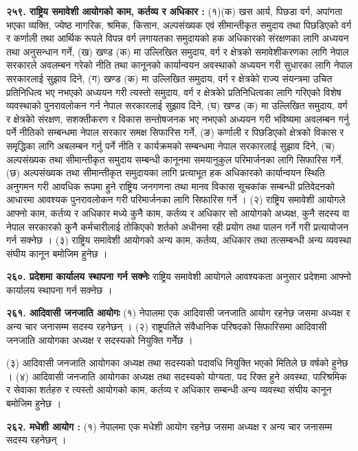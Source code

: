 \textbf{२५९. राष्ट्रिय समावेशी आयोगको काम, कर्तव्य र अधिकार :} (१)(क) खस आर्य, पिछडा वर्ग, अपांगता भएका व्यक्ति, ज्येष्ठ नागरिक, श्रमिक, किसान, अल्पसंख्यक एवं सीमान्तीकृत समुदाय तथा पिछडिएको वर्ग र कर्णाली तथा आर्थिक रूपले विपन्न वर्ग लगायतका समुदायको हक अधिकारको संरक्षणका लागि अध्ययन तथा अनुसन्धान गर्ने,
(ख) खण्ड (क) मा उल्लिखित समुदाय, वर्ग र क्षेत्रको समावेशीकरणका लागि नेपाल सरकारले अवलम्बन गरेको
नीति तथा कानूनको कार्यान्वयन अवस्थाको अध्ययन गरी सुधारका लागि नेपाल सरकारलाई सुझाव दिने,
(ग) खण्ड (क) मा उल्लिखित समुदाय, वर्ग र क्षेत्रकोे राज्य संयन्त्रमा उचित प्रतिनिधित्व भए नभएको अध्ययन गरी त्यस्तो समुदाय, वर्ग र क्षेत्रकोे प्रतिनिधित्वका लागि गरिएको विशेष व्यवस्थाको पुनरावलोकन गर्न नेपाल सरकारलाई सुझाव दिने,
(घ) खण्ड (क) मा उल्लिखित समुदाय, वर्ग र क्षेत्रकोे संरक्षण, सशक्तीकरण र विकास सन्तोषजनक भए नभएको अध्ययन गरी भविष्यमा अवलम्बन गर्नु पर्ने नीतिको सम्बन्धमा नेपाल सरकार समक्ष सिफारिस गर्ने,
(ङ) कर्णाली र पिछडिएको क्षेत्रको विकास र समृृद्धिका लागि अबलम्बन गर्नु पर्ने नीति र कार्यक्रमको सम्बन्धमा नेपाल सरकारलाई सुझाव दिने,
(च) अल्पसंख्यक तथा सीमान्तीकृत समुदाय सम्बन्धी कानूनमा समयानुकुल परिमार्जनका लागि सिफारिस गर्ने,
(छ) अल्पसंख्यक तथा सीमान्तीकृत समुदायका लागि प्रत्याभूत हक अधिकारको कार्यान्वयन स्थिति अनुगमन गरी आवधिक रूपमा हुने राष्ट्रिय जनगणना तथा मानव विकास सूचकांक सम्बन्धी प्रतिवेदनको आधारमा आवश्यक पुनरावलोकन गरी परिमार्जनका लागि सिफारिस गर्ने ।
(२) राष्ट्रिय समावेशी आयोगले आफ्नो काम, कर्तव्य र अधिकार मध्ये कुनै काम, कर्तव्य र अधिकार सो आयोगको अध्यक्ष, कुनै सदस्य वा नेपाल सरकारको कुनै कर्मचारीलाई तोकिएको शर्तको अधीनमा रही प्रयोग तथा पालन गर्ने गरी प्रत्यायोजन गर्न सक्नेछ ।
(३) राष्ट्रिय समावेशी आयोगको अन्य काम, कर्तव्य, अधिकार तथा तत्सम्बन्धी अन्य व्यवस्था संघीय कानून बमोजिम हुनेछ ।

\textbf{२६०. प्रदेशमा कार्यालय स्थापना गर्न सक्नेः} राष्ट्रिय समावेशी आयोगले आवश्यकता अनुसार प्रदेशमा आफ्नो कार्यालय स्थापना गर्न सक्नेछ ।

\textbf{२६१. आदिवासी जनजाति आयोगः} (१) नेपालमा एक आदिवासी जनजाति आयोग रहनेछ जसमा अध्यक्ष र अन्य चार जनासम्म सदस्य रहनेछन् ।
(२) राष्ट्रपतिले संवैधानिक परिषदको सिफारिसमा आदिवासी जनजाति आयोगका अध्यक्ष र सदस्यको नियुक्ति गर्नेेछ ।

(३) आदिवासी जनजाति आयोगका अध्यक्ष तथा सदस्यको पदावधि नियुक्ति भएको मितिले छ वर्षको हुनेछ ।
(४) आदिवासी जनजाति आयोगका अध्यक्ष तथा सदस्यको योग्यता, पद रिक्त हुने अवस्था, पारिश्रमिक र सेवाका शर्तहरु र त्यस्तो आयोगको काम, कर्तव्य र अधिकार सम्बन्धी अन्य व्यवस्था संघीय कानून बमोजिम हुनेछ ।

\textbf{२६२. मधेशी आयोग :} (१) नेपालमा एक मधेशी आयोग रहनेछ जसमा अध्यक्ष र अन्य चार जनासम्म सदस्य रहनेछन् ।

